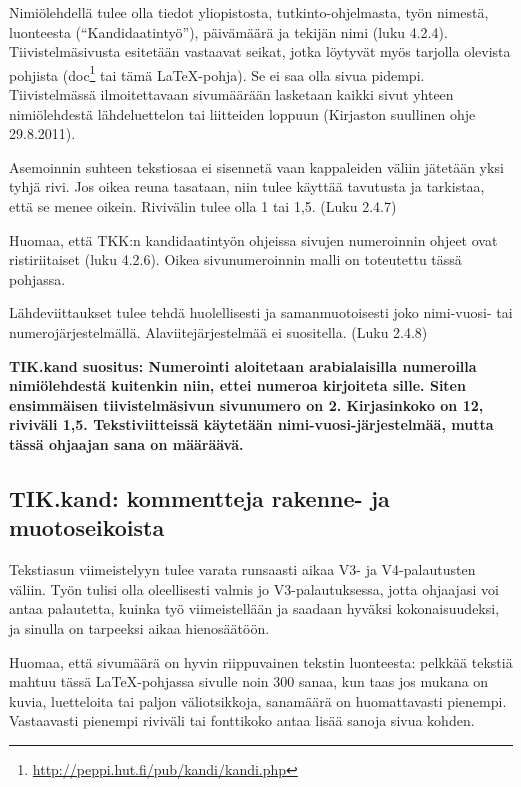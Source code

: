 Nimiölehdellä tulee olla tiedot yliopistosta, tutkinto-ohjelmasta,
työn nimestä, luonteesta (``Kandidaatintyö''), päivämäärä ja tekijän
nimi (luku 4.2.4). Tiivistelmäsivusta esitetään vastaavat seikat,
jotka löytyvät myös tarjolla olevista pohjista
(doc\footnote{\url{http://peppi.hut.fi/pub/kandi/kandi.php}} tai tämä
\LaTeX{}-pohja).  Se ei saa olla sivua pidempi. 
Tiivistelmässä
ilmoitettavaan sivumäärään lasketaan kaikki sivut yhteen 
nimiölehdestä lähdeluettelon tai liitteiden loppuun
(Kirjaston suullinen ohje 29.8.2011). 

Asemoinnin suhteen tekstiosaa ei sisennetä vaan kappaleiden väliin
jätetään yksi tyhjä rivi. Jos oikea reuna tasataan, niin tulee käyttää
tavutusta ja tarkistaa, että se menee oikein.  Rivivälin tulee olla 1
tai 1,5. (Luku 2.4.7)

Huomaa, että TKK:n kandidaatintyön ohjeissa sivujen numeroinnin ohjeet
ovat ristiriitaiset (luku 4.2.6). Oikea sivunumeroinnin malli on
toteutettu tässä pohjassa.  

Lähdeviittaukset tulee tehdä huolellisesti ja samanmuotoisesti joko
nimi-vuosi- tai numerojärjestelmällä. Alaviitejärjestelmää ei
suositella. (Luku 2.4.8)

\textbf{TIK.kand suositus: Numerointi aloitetaan arabialaisilla
  numeroilla nimiölehdestä kuitenkin niin, ettei numeroa kirjoiteta
  sille. Siten ensimmäisen tiivistelmäsivun sivunumero on 2. 
  Kirjasinkoko on 12, riviväli 1,5. Tekstiviitteissä käytetään
  nimi-vuosi-järjestelmää, mutta tässä ohjaajan sana on määräävä.}

\subsection{TIK.kand: kommentteja rakenne- ja muotoseikoista}

Tekstiasun viimeistelyyn tulee varata runsaasti aikaa V3- ja
V4-palautusten väliin. Työn tulisi olla oleellisesti valmis jo
V3-palautuksessa, jotta ohjaajasi voi antaa palautetta, kuinka työ
viimeistellään ja saadaan hyväksi kokonaisuudeksi, ja sinulla on 
tarpeeksi aikaa hienosäätöön.

Huomaa, että sivumäärä on hyvin riippuvainen tekstin luonteesta:
pelkkää tekstiä mahtuu tässä \LaTeX{}-pohjassa sivulle noin 300 sanaa,
kun taas jos mukana on kuvia, luetteloita tai paljon väliotsikkoja,
sanamäärä on huomattavasti pienempi. Vastaavasti pienempi riviväli tai
fonttikoko antaa lisää sanoja sivua kohden.

